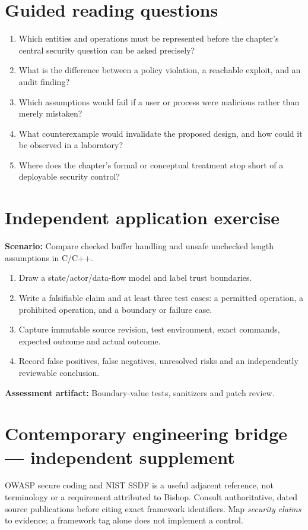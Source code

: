 \documentclass[10pt,letterpaper]{article}
\begin{document}
\section{Guided reading questions}
\begin{enumerate}
\item Which entities and operations must be represented before the chapter's central security question can be asked precisely?
\item What is the difference between a policy violation, a reachable exploit, and an audit finding?
\item Which assumptions would fail if a user or process were malicious rather than merely mistaken?
\item What counterexample would invalidate the proposed design, and how could it be observed in a laboratory?
\item Where does the chapter's formal or conceptual treatment stop short of a deployable security control?
\end{enumerate}
\section{Independent application exercise}
\textbf{Scenario:} Compare checked buffer handling and unsafe unchecked length assumptions in C/C++.
\begin{enumerate}
\item Draw a state/actor/data-flow model and label trust boundaries.
\item Write a falsifiable claim and at least three test cases: a permitted operation, a prohibited operation, and a boundary or failure case.
\item Capture immutable source revision, test environment, exact commands, expected outcome and actual outcome.
\item Record false positives, false negatives, unresolved risks and an independently reviewable conclusion.
\end{enumerate}
\textbf{Assessment artifact:} Boundary-value tests, sanitizers and patch review.
\section{Contemporary engineering bridge --- independent supplement}
OWASP secure coding and NIST SSDF is a useful adjacent reference, not terminology or a requirement attributed to Bishop. Consult authoritative, dated source publications before citing exact framework identifiers. Map \emph{security claims} to evidence; a framework tag alone does not implement a control.
\end{document}
